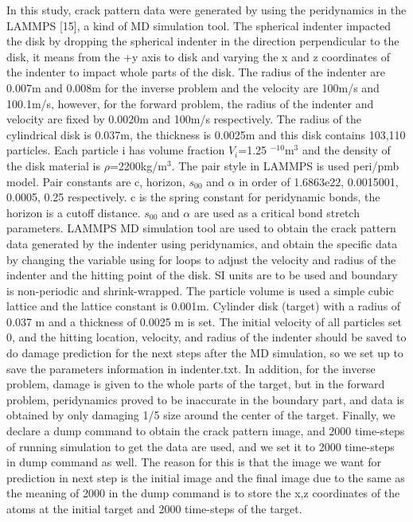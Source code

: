 In this study, crack pattern data were generated by using the peridynamics in the LAMMPS [15], a kind of MD simulation tool.
The spherical indenter impacted the disk by dropping the spherical indenter in the direction perpendicular to the disk, it means from the +y axis to disk and varying the x and z coordinates of the indenter to impact whole parts of the disk. The radius of the indenter are 0.007m and 0.008m for the inverse problem and the velocity are 100m/s and 100.1m/s, however, for the forward problem, the radius of the indenter and velocity are fixed by 0.0020m and 100m/s respectively. The radius of the cylindrical disk is 0.037m, the thickness is 0.0025m and this disk contains 103,110 particles. Each particle i has volume fraction $V_i$=1.25 $^{-10}$m$^3$ and the density of the disk material is $\rho$=2200kg/m$^3$. The pair style in LAMMPS is used peri/pmb model. Pair constants are c, horizon, $s_{00}$ and $\alpha$ in order of 1.6863e22, 0.0015001, 0.0005, 0.25 respectively. c is the spring constant for peridynamic bonds, the horizon is a cutoff distance. $s_{00}$ and $\alpha$ are used as a critical bond stretch parameters. LAMMPS MD simulation tool are used to obtain the crack pattern data generated by the indenter using peridynamics, and obtain the specific data by changing the variable using for loops to adjust the velocity and radius of the indenter and the hitting point of the disk. SI units are to be used and boundary is non-periodic and shrink-wrapped. The particle volume is used a simple cubic lattice and the lattice constant is 0.001m. Cylinder disk (target) with a radius of 0.037 m and a thickness of 0.0025 m is set. The initial velocity of all particles set 0, and the hitting location, velocity, and radius of the indenter should be saved to do damage prediction for the next steps after the MD simulation, so we set up to save the parameters information in indenter.txt. In addition, for the inverse problem, damage is given to the whole parts of the target, but in the forward problem, peridynamics proved to be inaccurate in the boundary part, and data is obtained by only damaging 1/5 size around the center of the target. Finally, we declare a dump command to obtain the crack pattern image, and 2000 time-steps of running simulation to get the data are used, and we set it to 2000 time-steps in dump command as well. The reason for this is that the image we want for prediction in next step is the initial image and the final image due to the same as the meaning of 2000 in the dump command is to store the x,z coordinates of the atoms at the initial target and 2000 time-steps of the target. 


